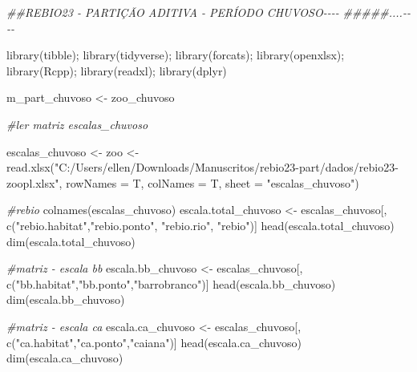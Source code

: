 \documentclass[
  letterpaper,
  DIV=11,
  numbers=noendperiod]{scrartcl}
\newenvironment{Shaded}{}{}
\newcommand{\AttributeTok}[1]{\textcolor[rgb]{0.49,0.56,0.16}{#1}}
\newcommand{\CommentTok}[1]{\textcolor[rgb]{0.38,0.63,0.69}{\textit{#1}}}
\newcommand{\DocumentationTok}[1]{\textcolor[rgb]{0.73,0.13,0.13}{\textit{#1}}}
\newcommand{\FunctionTok}[1]{\textcolor[rgb]{0.02,0.16,0.49}{#1}}
\newcommand{\NormalTok}[1]{#1}
\newcommand{\OtherTok}[1]{\textcolor[rgb]{0.00,0.44,0.13}{#1}}
\newcommand{\StringTok}[1]{\textcolor[rgb]{0.25,0.44,0.63}{#1}}
\begin{document}
\begin{Shaded}
\begin{Highlighting}[numbers=left,,]
\DocumentationTok{\#\#REBIO23 {-} PARTIÇÃO ADITIVA {-} PERÍODO CHUVOSO{-}{-}{-}{-}}
\DocumentationTok{\#\#\#\#\#....{-}{-}{-}{-}}

\FunctionTok{library}\NormalTok{(tibble); }\FunctionTok{library}\NormalTok{(tidyverse); }\FunctionTok{library}\NormalTok{(forcats); }\FunctionTok{library}\NormalTok{(openxlsx); }\FunctionTok{library}\NormalTok{(Rcpp); }\FunctionTok{library}\NormalTok{(readxl); }\FunctionTok{library}\NormalTok{(dplyr)}

\NormalTok{m\_part\_chuvoso }\OtherTok{\textless{}{-}}\NormalTok{ zoo\_chuvoso}

\CommentTok{\#ler matriz escalas\_chuvoso}

\NormalTok{escalas\_chuvoso }\OtherTok{\textless{}{-}}\NormalTok{ zoo }\OtherTok{\textless{}{-}} \FunctionTok{read.xlsx}\NormalTok{(}\StringTok{"C:/Users/ellen/Downloads/Manuscritos/rebio23{-}part/dados/rebio23{-}zoopl.xlsx"}\NormalTok{,}
                                 \AttributeTok{rowNames =}\NormalTok{ T, }\AttributeTok{colNames =}\NormalTok{ T,}
                                 \AttributeTok{sheet =} \StringTok{"escalas\_chuvoso"}\NormalTok{)}

\CommentTok{\#rebio}
\FunctionTok{colnames}\NormalTok{(escalas\_chuvoso)}
\NormalTok{escala.total\_chuvoso }\OtherTok{\textless{}{-}}\NormalTok{ escalas\_chuvoso[, }\FunctionTok{c}\NormalTok{(}\StringTok{"rebio.habitat"}\NormalTok{,}\StringTok{"rebio.ponto"}\NormalTok{, }\StringTok{"rebio.rio"}\NormalTok{, }\StringTok{"rebio"}\NormalTok{)]}
\FunctionTok{head}\NormalTok{(escala.total\_chuvoso)}
\FunctionTok{dim}\NormalTok{(escala.total\_chuvoso)}

\CommentTok{\#matriz {-} escala bb}
\NormalTok{escala.bb\_chuvoso }\OtherTok{\textless{}{-}}\NormalTok{ escalas\_chuvoso[, }\FunctionTok{c}\NormalTok{(}\StringTok{"bb.habitat"}\NormalTok{,}\StringTok{"bb.ponto"}\NormalTok{,}\StringTok{"barrobranco"}\NormalTok{)]}
\FunctionTok{head}\NormalTok{(escala.bb\_chuvoso)}
\FunctionTok{dim}\NormalTok{(escala.bb\_chuvoso)}

\CommentTok{\#matriz {-} escala ca}
\NormalTok{escala.ca\_chuvoso }\OtherTok{\textless{}{-}}\NormalTok{ escalas\_chuvoso[, }\FunctionTok{c}\NormalTok{(}\StringTok{"ca.habitat"}\NormalTok{,}\StringTok{"ca.ponto"}\NormalTok{,}\StringTok{"caiana"}\NormalTok{)]}
\FunctionTok{head}\NormalTok{(escala.ca\_chuvoso)}
\FunctionTok{dim}\NormalTok{(escala.ca\_chuvoso)}


\end{Highlighting}
\end{Shaded}
\end{document}
